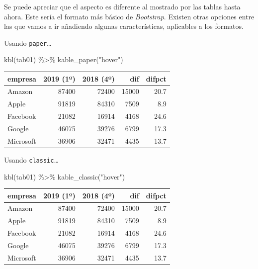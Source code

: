 \documentclass[
]{book}
\newenvironment{Shaded}{\begin{snugshade}}{\end{snugshade}}
\newcommand{\FunctionTok}[1]{\textcolor[rgb]{0.00,0.00,0.00}{#1}}
\newcommand{\NormalTok}[1]{#1}
\newcommand{\SpecialCharTok}[1]{\textcolor[rgb]{0.00,0.00,0.00}{#1}}
\newcommand{\StringTok}[1]{\textcolor[rgb]{0.31,0.60,0.02}{#1}}
\begin{document}
Se puede apreciar que el aspecto es diferente al mostrado por las tablas hasta ahora. Este sería el formato más básico de \emph{Bootstrap}. Existen otras opciones entre las que vamos a ir añadiendo algunas características, aplicables a los formatos.

Usando \texttt{paper}\ldots{}

\begin{Shaded}
\begin{Highlighting}[]
\FunctionTok{kbl}\NormalTok{(tab01) }\SpecialCharTok{\%\textgreater{}\%} \FunctionTok{kable\_paper}\NormalTok{(}\StringTok{"hover"}\NormalTok{)}
\end{Highlighting}
\end{Shaded}

\begin{table}
\centering
\begin{tabular}[t]{l|r|r|r|r}
\hline
empresa & 2019 (1º) & 2018 (4º) & dif & difpct\\
\hline
Amazon & 87400 & 72400 & 15000 & 20.7\\
\hline
Apple & 91819 & 84310 & 7509 & 8.9\\
\hline
Facebook & 21082 & 16914 & 4168 & 24.6\\
\hline
Google & 46075 & 39276 & 6799 & 17.3\\
\hline
Microsoft & 36906 & 32471 & 4435 & 13.7\\
\hline
\end{tabular}
\end{table}

Usando \texttt{classic}\ldots{}

\begin{Shaded}
\begin{Highlighting}[]
\FunctionTok{kbl}\NormalTok{(tab01) }\SpecialCharTok{\%\textgreater{}\%} \FunctionTok{kable\_classic}\NormalTok{(}\StringTok{"hover"}\NormalTok{)}
\end{Highlighting}
\end{Shaded}

\begin{table}
\centering
\begin{tabular}[t]{l|r|r|r|r}
\hline
empresa & 2019 (1º) & 2018 (4º) & dif & difpct\\
\hline
Amazon & 87400 & 72400 & 15000 & 20.7\\
\hline
Apple & 91819 & 84310 & 7509 & 8.9\\
\hline
Facebook & 21082 & 16914 & 4168 & 24.6\\
\hline
Google & 46075 & 39276 & 6799 & 17.3\\
\hline
Microsoft & 36906 & 32471 & 4435 & 13.7\\
\hline
\end{tabular}
\end{table}
\end{document}

